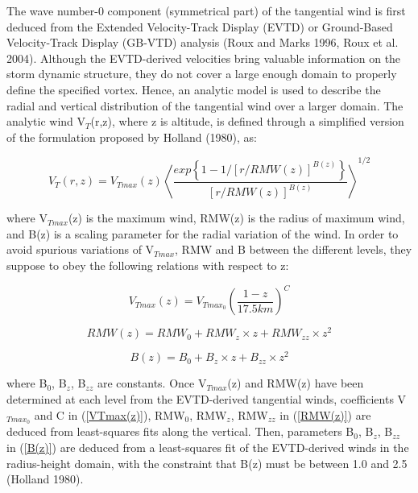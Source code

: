 The wave number-0 component (symmetrical part) of the tangential wind is first 
deduced from the Extended Velocity-Track Display (EVTD) or Ground-Based 
Velocity-Track Display (GB-VTD) analysis (Roux and Marks 1996, Roux et al. 2004). Although the EVTD-derived velocities bring valuable information on the storm dynamic structure, they do not cover a large enough domain to properly define the specified vortex. Hence, an analytic model is used to describe the radial and vertical 
distribution of the tangential wind over a larger domain. The analytic wind 
V$_{T}$(r,z), where z is altitude, is defined through a simplified version of the 
formulation proposed by Holland (1980), as:

\begin{equation}
V_{T}(r,z)=V_{Tmax}(z) \left\langle \dfrac{exp\left\lbrace 1-1/\left[ r/RMW(z)\right]^{B(z)}\right\rbrace } {[r/RMW(z)]^{B(z)}} \right\rangle^{1/2} 
\label{VT(r,z)}
\end{equation}

where V$_{Tmax}$(z) is the maximum wind, RMW(z) is the radius of maximum wind, and 
B(z) is a scaling parameter for the radial variation of the wind. In order to avoid 
spurious variations of V$_{Tmax}$, RMW and B between the different levels, they 
suppose to obey the following relations with respect to z:

\begin{equation}
V_{Tmax}(z)=V_{Tmax_0} \left(\dfrac{1-z}{17.5 km} \right)^C 
\label{VTmax(z)}
\end{equation} 

\begin{equation}
RMW(z)=RMW_0+RMW_z \times z+RMW_{zz} \times z^2
\label{RMW(z)}
\end{equation}

\begin{equation}
B(z)=B_0+B_z \times z+B_{zz} \times z^2
\label{B(z)}
\end{equation}

where B$_{0}$, B$_{z}$, B$_{zz}$ are constants. Once V$_{Tmax}$(z) and RMW(z) have 
been determined at each level from the EVTD-derived tangential winds, coefficients 
V$_{Tmax_0}$  and C in (\ref{VTmax(z)}), RMW$_{0}$, RMW$_{z}$, RMW$_{zz}$ in (\ref{RMW(z)})
are deduced from least-squares fits along the vertical. Then, parameters B$_{0}$, B$_{z}$, B$_{zz}$ in (\ref{B(z)}) are deduced from a least-squares fit of the 
EVTD-derived winds in the radius-height domain, with the constraint that B(z) must be 
between 1.0 and 2.5 (Holland 1980).



